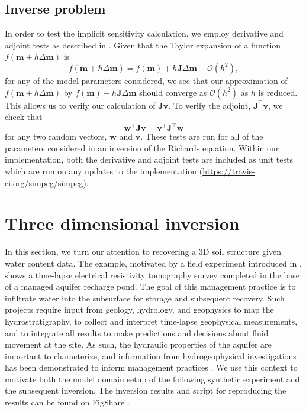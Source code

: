 \documentclass[preprint,review,3p,times,onecolumn,authoryear]{elsarticle}
\begin{document}
\subsection{Inverse problem}
In order to test the implicit sensitivity calculation, we employ derivative and adjoint tests as described in \cite{haber2015computational}. Given that the Taylor expansion of a function $f(\mathbf{m} + h \Delta \mathbf{m})$ is
\begin{equation}
    f(\mathbf{m}+ h  \Delta \mathbf{m}) = f(\mathbf{m}) + h  \mathbf{J} \Delta \mathbf{m} + \mathcal{O}(h^2),
\end{equation}
for any of the model parameters considered, we see that our approximation of $f(\mathbf{m}+ h  \Delta \mathbf{m})$ by $ f(\mathbf{m}) + h  \mathbf{J} \Delta \mathbf{m}$ should converge as $\mathcal{O}(h^2)$ as $h$ is reduced. This allows us to verify our calculation of $\mathbf{J}\mathbf{v}$. To verify the adjoint, $\mathbf{J}^\top\mathbf{v}$, we check that
\begin{equation}
    \mathbf{w}^\top\mathbf{J}\mathbf{v} = \mathbf{v}^\top \mathbf{J}^\top \mathbf{w}
\end{equation}
for any two random vectors, $\mathbf{w}$ and $\mathbf{v}$. These tests are run for all of the parameters considered in an inversion of the Richards equation. Within our implementation, both the derivative and adjoint tests are included as unit tests which are run on any updates to the implementation (\url{https://travis-ci.org/simpeg/simpeg}).
\section{Three dimensional inversion}
\label{sec:richards-examples}

In this section, we turn our attention to recovering a 3D soil structure given water content data. The example, motivated by a field experiment introduced in \cite{Pidlisecky2013}, shows a time-lapse electrical resistivity tomography survey completed in the base of a managed aquifer recharge pond. The goal of this management practice is to infiltrate water into the subsurface for storage and subsequent recovery. Such projects require input from geology, hydrology, and geophysics to map the hydrostratigraphy, to collect and interpret time-lapse geophysical measurements, and to integrate all results to make predictions and decisions about fluid movement at the site. As such, the hydraulic properties of the aquifer are important to characterize, and information from hydrogeophysical investigations has been demonstrated to inform management practices \citep{Pidlisecky2013}. We use this context to motivate both the model domain setup of the following synthetic experiment and the subsequent inversion. The inversion results and script for reproducing the results can be found on FigShare \citep{RichardsResults2015}.
\end{document}
